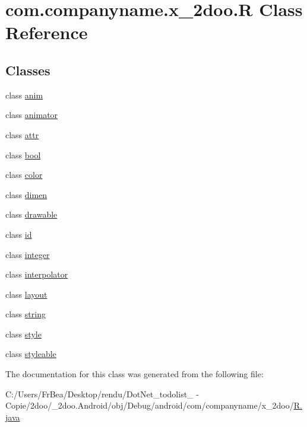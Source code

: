 \hypertarget{classcom_1_1companyname_1_1x__2doo_1_1_r}{
\section{com.companyname.x\_\-2doo.R Class Reference}
\label{classcom_1_1companyname_1_1x__2doo_1_1_r}
}
\subsection*{Classes}
\begin{CompactItemize}
\item 
class \hyperlink{classcom_1_1companyname_1_1x__2doo_1_1_r_1_1anim}{anim}
\item 
class \hyperlink{classcom_1_1companyname_1_1x__2doo_1_1_r_1_1animator}{animator}
\item 
class \hyperlink{classcom_1_1companyname_1_1x__2doo_1_1_r_1_1attr}{attr}
\item 
class \hyperlink{classcom_1_1companyname_1_1x__2doo_1_1_r_1_1bool}{bool}
\item 
class \hyperlink{classcom_1_1companyname_1_1x__2doo_1_1_r_1_1color}{color}
\item 
class \hyperlink{classcom_1_1companyname_1_1x__2doo_1_1_r_1_1dimen}{dimen}
\item 
class \hyperlink{classcom_1_1companyname_1_1x__2doo_1_1_r_1_1drawable}{drawable}
\item 
class \hyperlink{classcom_1_1companyname_1_1x__2doo_1_1_r_1_1id}{id}
\item 
class \hyperlink{classcom_1_1companyname_1_1x__2doo_1_1_r_1_1integer}{integer}
\item 
class \hyperlink{classcom_1_1companyname_1_1x__2doo_1_1_r_1_1interpolator}{interpolator}
\item 
class \hyperlink{classcom_1_1companyname_1_1x__2doo_1_1_r_1_1layout}{layout}
\item 
class \hyperlink{classcom_1_1companyname_1_1x__2doo_1_1_r_1_1string}{string}
\item 
class \hyperlink{classcom_1_1companyname_1_1x__2doo_1_1_r_1_1style}{style}
\item 
class \hyperlink{classcom_1_1companyname_1_1x__2doo_1_1_r_1_1styleable}{styleable}
\end{CompactItemize}


The documentation for this class was generated from the following file:\begin{CompactItemize}
\item 
C:/Users/FrBea/Desktop/rendu/DotNet\_\-todolist\_ - Copie/2doo/\_\-2doo.Android/obj/Debug/android/com/companyname/x\_\-2doo/\hyperlink{com_2companyname_2x__2doo_2_r_8java}{R.java}\end{CompactItemize}
